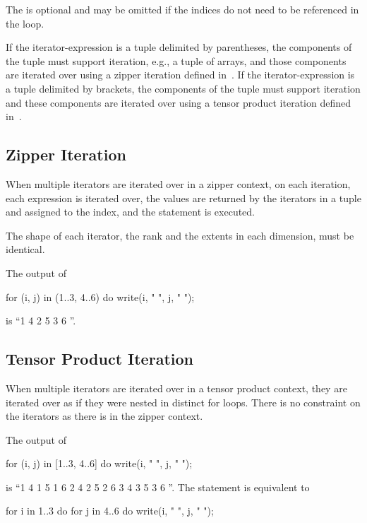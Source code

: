 The  is optional and may be omitted if the
indices do not need to be referenced in the loop.

If the iterator-expression is a tuple delimited by parentheses, the
components of the tuple must support iteration, e.g., a tuple of
arrays, and those components are iterated over using a zipper
iteration defined in~.  If the
iterator-expression is a tuple delimited by brackets, the components
of the tuple must support iteration and these components are iterated
over using a tensor product iteration defined
in~.

\subsection{Zipper Iteration}
\label{Zipper_Iteration}

When multiple iterators are iterated over in a zipper context, on each
iteration, each expression is iterated over, the values are returned
by the iterators in a tuple and assigned to the index, and the
statement is executed.

The shape of each iterator, the rank and the extents in each
dimension, must be identical.

\begin{example}
The output of
\begin{chapel}
for (i, j) in (1..3, 4..6) do
  write(i, " ", j, " ");
\end{chapel}
is ``1 4 2 5 3 6 ''.
\end{example}

\subsection{Tensor Product Iteration}
\label{Tensor_Product_Iteration}
When multiple iterators are iterated over in a tensor product context,
they are iterated over as if they were nested in distinct for loops.
There is no constraint on the iterators as there is in the zipper
context.

\begin{example}
The output of
\begin{chapel}
for (i, j) in [1..3, 4..6] do
  write(i, " ", j, " ");
\end{chapel}
is ``1 4 1 5 1 6 2 4 2 5 2 6 3 4 3 5 3 6 ''. The statement is
equivalent to
\begin{chapel}
for i in 1..3 do
  for j in 4..6 do
    write(i, " ", j, " ");
\end{chapel}
\end{example}

